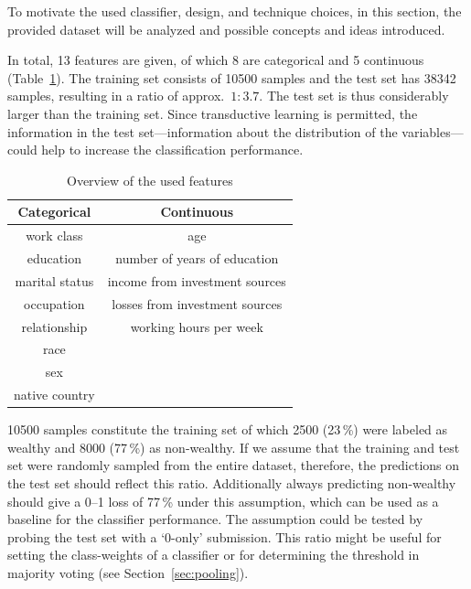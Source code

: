 \documentclass[a4paper,11pt]{article}
\begin{document}
To motivate the used classifier, design, and technique choices, in
this section, the provided dataset will be analyzed and possible
concepts and ideas introduced.

In total, 13 features are given, of which 8 are categorical and 5
continuous (Table~\ref{tab:features}).
The training set consists of 10500 samples and the test set has 38342
samples, resulting in a ratio of approx.\ $1:3.7$.  The test set is
thus considerably larger than the training set.
Since transductive learning is permitted, the information in the test
set---information about the distribution of the variables---could help
to increase the classification performance.

\begin{table}[h]
  \centering
  \begin{tabular}{cc}
    \toprule
  Categorical  & Continuous                     \\
    \midrule
    work class & age                            \\
    education  & number of years of education   \\
marital status & income from investment sources \\
occupation     & losses from investment sources \\
relationship   & working hours per week         \\
race           &                                \\
sex            &                                \\
native country &                                \\
      \bottomrule
  \end{tabular}
  \caption{{Overview of the used features}}
  \label{tab:features}
\end{table}

10500 samples constitute the training set of which 2500 (23\,\%) were
labeled as wealthy and 8000 (77\,\%) as non-wealthy. If we assume that
the training and test set were randomly sampled from the entire
dataset, therefore, the predictions on the test set should reflect
this ratio. Additionally always predicting non-wealthy should give a
0--1 loss of 77\,\% under this assumption, which can be used as a
baseline for the classifier performance. The assumption could be
tested by probing the test set with a `0-only' submission. This ratio
might be useful for setting the class-weights of a classifier or for
determining the threshold in majority voting
(see
Section~\ref{sec:pooling}).
\end{document}
